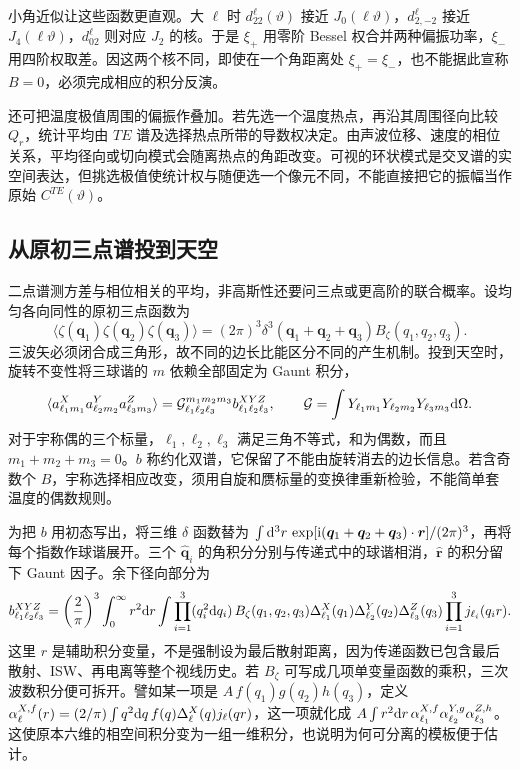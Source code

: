 小角近似让这些函数更直观。大 $\ell$ 时 $d^\ell_{22}(\vartheta)$ 接近 $J_0(\ell\vartheta)$，$d^\ell_{2,-2}$ 接近 $J_4(\ell\vartheta)$，$d^\ell_{02}$ 则对应 $J_2$ 的核。于是 $\xi_+$ 用零阶 Bessel 权合并两种偏振功率，$\xi_-$ 用四阶权取差。因这两个核不同，即使在一个角距离处 $\xi_+=\xi_-$，也不能据此宣称 $B=0$，必须完成相应的积分反演。

还可把温度极值周围的偏振作叠加。若先选一个温度热点，再沿其周围径向比较 $Q_r$，统计平均由 $TE$ 谱及选择热点所带的导数权决定。由声波位移、速度的相位关系，平均径向或切向模式会随离热点的角距改变。可视的环状模式是交叉谱的实空间表达，但挑选极值使统计权与随便选一个像元不同，不能直接把它的振幅当作原始 $C^{TE}(\vartheta)$。

\subsection{从原初三点谱投到天空}

二点谱测方差与相位相关的平均，非高斯性还要问三点或更高阶的联合概率。设均匀各向同性的原初三点函数为
\[
 \langle\zeta(\bm q_1)\zeta(\bm q_2)\zeta(\bm q_3)\rangle
 =(2\pi)^3\delta^3(\bm q_1+\bm q_2+\bm q_3)
                              B_\zeta(q_1,q_2,q_3).
\]
三波矢必须闭合成三角形，故不同的边长比能区分不同的产生机制。投到天空时，旋转不变性将三球谐的 $m$ 依赖全部固定为 Gaunt 积分，
\[
 \langle a_{\ell_1m_1}^X a_{\ell_2m_2}^Y a_{\ell_3m_3}^Z\rangle
 =\mathcal G_{\ell_1\ell_2\ell_3}^{m_1m_2m_3}
                      b_{\ell_1\ell_2\ell_3}^{XYZ},
 \qquad
 \mathcal G=\int Y_{\ell_1m_1}Y_{\ell_2m_2}Y_{\ell_3m_3}\dd\Omega .
\]
对于宇称偶的三个标量，$\ell_1,\ell_2,\ell_3$ 满足三角不等式，和为偶数，而且 $m_1+m_2+m_3=0$。$b$ 称约化双谱，它保留了不能由旋转消去的边长信息。若含奇数个 $B$，宇称选择相应改变，须用自旋和赝标量的变换律重新检验，不能简单套温度的偶数规则。

为把 $b$ 用初态写出，将三维 $\delta$ 函数替为 $\int\dd^3r\,\exp[\mathrm{i}(\bm q_1+\bm q_2+\bm q_3)\cdot\bm r]/(2\pi)^3$，再将每个指数作球谐展开。三个 $\hat{\bm q}_i$ 的角积分分别与传递式中的球谐相消，$\hat{\bm r}$ 的积分留下 Gaunt 因子。余下径向部分为
\begin{equation}\label{eq:cl-bispectrum}
 b_{\ell_1\ell_2\ell_3}^{XYZ}
 =\left(\frac2\pi\right)^3\int_0^\infty r^2\dd r
     \int\prod_{i=1}^3(q_i^2\dd q_i)\,
 B_\zeta(q_1,q_2,q_3)
 \Delta_{\ell_1}^X(q_1)\Delta_{\ell_2}^Y(q_2)\Delta_{\ell_3}^Z(q_3)
 \prod_{i=1}^3j_{\ell_i}(q_i r).
\end{equation}
这里 $r$ 是辅助积分变量，不是强制设为最后散射距离，因为传递函数已包含最后散射、ISW、再电离等整个视线历史。若 $B_\zeta$ 可写成几项单变量函数的乘积，三次波数积分便可拆开。譬如某一项是 $A\,f(q_1)g(q_2)h(q_3)$，定义 $\alpha_\ell^{X,f}(r)=(2/\pi)\int q^2\dd q\,f(q)\Delta_\ell^X(q)j_\ell(qr)$，这一项就化成 $A\int r^2\dd r\,\alpha_{\ell_1}^{X,f}\alpha_{\ell_2}^{Y,g}\alpha_{\ell_3}^{Z,h}$。这使原本六维的相空间积分变为一组一维积分，也说明为何可分离的模板便于估计。

